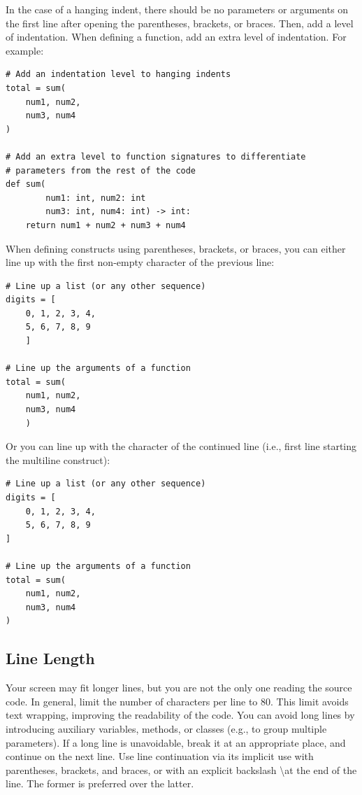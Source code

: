 \documentclass{tufte-handout}
\begin{document}
In the case of a hanging indent, there should be no parameters or arguments on the first line after opening the parentheses, brackets, or braces.
Then, add a level of indentation.
When defining a function, add an extra level of indentation.
For example:

\begin{mdframed}
\begin{verbatim}
# Add an indentation level to hanging indents
total = sum(
    num1, num2,
    num3, num4
)

# Add an extra level to function signatures to differentiate 
# parameters from the rest of the code
def sum(
        num1: int, num2: int
        num3: int, num4: int) -> int:
    return num1 + num2 + num3 + num4
\end{verbatim}
\end{mdframed}

When defining constructs using parentheses, brackets, or braces, you can either line up with the first non-empty character of the previous line:

\begin{mdframed}
\begin{verbatim}
# Line up a list (or any other sequence)
digits = [
    0, 1, 2, 3, 4,
    5, 6, 7, 8, 9 
    ]
    
# Line up the arguments of a function
total = sum(
    num1, num2,
    num3, num4
    )
\end{verbatim}
\end{mdframed}

Or you can line up with the character of the continued line (i.e., first line starting the multiline construct):

\begin{mdframed}
\begin{verbatim}
# Line up a list (or any other sequence)
digits = [
	0, 1, 2, 3, 4,
	5, 6, 7, 8, 9 
]
	
# Line up the arguments of a function
total = sum(
	num1, num2,
	num3, num4
)
\end{verbatim}
\end{mdframed}

\subsection{Line Length}
Your screen may fit longer lines, but you are not the only one reading the source code.
In general, limit the number of characters per line to 80.
This limit avoids text wrapping, improving the readability of the code.
You can avoid long lines by introducing auxiliary variables, methods, or classes (e.g., to group multiple parameters).
If a long line is unavoidable, break it at an appropriate place, and continue on the next line.
Use line continuation via its implicit use with parentheses, brackets, and braces, or with an explicit backslash \textbackslash  at the end of the line.
The former is preferred over the latter.
\end{document}
